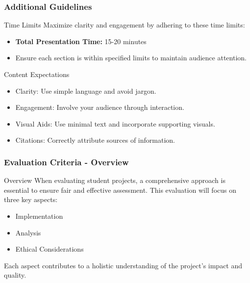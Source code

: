 \documentclass[aspectratio=169]{beamer}
\begin{document}
\begin{frame}[fragile]
    \frametitle{Additional Guidelines}
    \begin{block}{Time Limits}
        Maximize clarity and engagement by adhering to these time limits:
        \begin{itemize}
            \item \textbf{Total Presentation Time:} 15-20 minutes
            \item Ensure each section is within specified limits to maintain audience attention.
        \end{itemize}
    \end{block}

    \begin{block}{Content Expectations}
        \begin{itemize}
            \item Clarity: Use simple language and avoid jargon.
            \item Engagement: Involve your audience through interaction.
            \item Visual Aids: Use minimal text and incorporate supporting visuals.
            \item Citations: Correctly attribute sources of information.
        \end{itemize}
    \end{block}
\end{frame}

\begin{frame}[fragile]
    \frametitle{Evaluation Criteria - Overview}
    \begin{block}{Overview}
        When evaluating student projects, a comprehensive approach is essential to ensure fair and effective assessment. 
        This evaluation will focus on three key aspects:
        \begin{itemize}
            \item Implementation
            \item Analysis
            \item Ethical Considerations
        \end{itemize}
        Each aspect contributes to a holistic understanding of the project's impact and quality.
    \end{block}
\end{frame}
\end{document}
